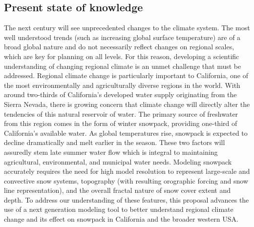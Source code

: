 \documentclass[11pt]{article}
\begin{document}
\subsection{Present state of knowledge}
The next century will see unprecedented changes to the climate system. The most well understood trends (such as increasing global surface temperature) are of a broad global nature and do not necessarily reflect changes on regional scales, which are key for planning on all levels. For this reason, developing a scientific understanding of changing regional climate is an unmet challenge that must be addressed. Regional climate change is particularly important to California, one of the most environmentally and agriculturally diverse regions in the world. With around two-thirds of California's developed water supply originating from the Sierra Nevada, there is growing concern that climate change will directly alter the tendencies of this natural reservoir of water.  The primary source of freshwater from this region comes in the form of winter snowpack, providing one-third of California’s available water.  As global temperatures rise, snowpack is expected to decline dramatically and melt earlier in the season.  These two factors will assuredly stem late summer water flow which is integral to maintaining agricultural, environmental, and municipal water needs.  Modeling snowpack accurately requires the need for high model resolution to represent large-scale and convective snow systems, topography (with resulting orographic forcing and snow line representation), and the overall fractal nature of snow cover extent and depth. To address our understanding of these features, this proposal advances the use of a next generation modeling tool to better understand regional climate change and its effect on snowpack in California and the broader western USA.
\end{document}

